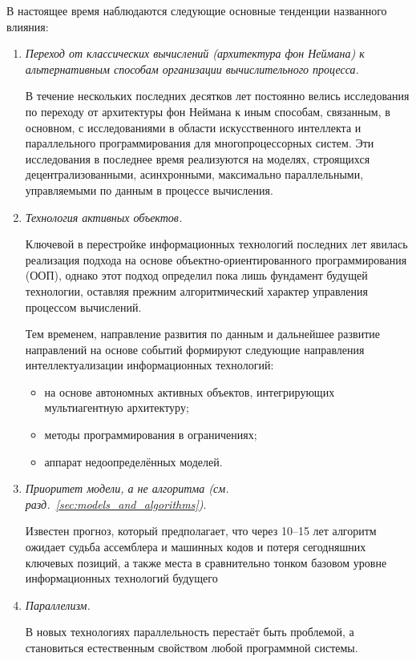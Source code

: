 В настоящее время наблюдаются следующие основные тенденции названного
влияния:
\begin{enumerate}
\item \emph{Переход от классических вычислений (архитектура фон Неймана) к
  альтернативным способам организации вычислительного процесса.}

  В течение нескольких последних десятков лет постоянно велись
  исследования по переходу от архитектуры фон Неймана к иным способам,
  связанным, в основном, с исследованиями в области искусственного
  интеллекта и параллельного программирования для многопроцессорных
  систем. Эти исследования в последнее время реализуются на моделях,
  строящихся децентрализованными, асинхронными, максимально
  параллельными, управляемыми по данным в процессе вычисления.
\item \emph{Технология активных объектов.}

  Ключевой в перестройке информационных технологий последних лет
  явилась реализация подхода на основе объектно-ориентированного
  программирования (ООП), однако этот подход определил пока лишь
  фундамент будущей технологии, оставляя прежним алгоритмический
  характер управления процессом вычислений.

  Тем временем, направление развития по данным и дальнейшее развитие
  направлений на основе событий формируют следующие направления
  интеллектуализации информационных технологий:
  \begin{itemize}
  \item на основе автономных активных объектов, интегрирующих
    мультиагентную архитектуру;
  \item методы программирования в ограничениях;
  \item аппарат недоопределённых моделей.
  \end{itemize}
\item \emph{Приоритет модели, а не алгоритма
    (см. разд.~\ref{sec:models_and_algorithms})}.

  Известен прогноз, который предполагает, что через 10--15 лет
  алгоритм ожидает судьба ассемблера и машинных кодов и потеря
  сегодняшних ключевых позиций, а также места в сравнительно тонком
  базовом уровне информационных технологий будущего
\item \emph{Параллелизм.}

  В новых технологиях параллельность перестаёт быть проблемой, а
  становиться естественным свойством любой программной системы.
\end{enumerate}



